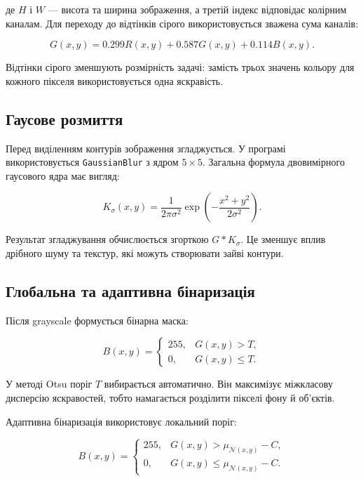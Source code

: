 \documentclass[12pt,a4paper]{article}
\begin{document}
де \(H\) і \(W\) --- висота та ширина зображення, а третій індекс відповідає колірним каналам. Для переходу до відтінків сірого використовується зважена сума каналів:

\begin{equation}
  G(x,y)=0.299R(x,y)+0.587G(x,y)+0.114B(x,y).
\end{equation}

Відтінки сірого зменшують розмірність задачі: замість трьох значень кольору для кожного пікселя використовується одна яскравість.

\subsection{Гаусове розмиття}

Перед виділенням контурів зображення згладжується. У програмі використовується \texttt{GaussianBlur} з ядром \(5\times5\). Загальна формула двовимірного гаусового ядра має вигляд:

\begin{equation}
  K_\sigma(x,y)=\frac{1}{2\pi\sigma^2}
  \exp\left(-\frac{x^2+y^2}{2\sigma^2}\right).
\end{equation}

Результат згладжування обчислюється згорткою \(G*K_\sigma\). Це зменшує вплив дрібного шуму та текстур, які можуть створювати зайві контури.

\subsection{Глобальна та адаптивна бінаризація}

Після grayscale формується бінарна маска:

\begin{equation}
  B(x,y)=
  \begin{cases}
    255, & G(x,y)>T,\\
    0, & G(x,y)\leq T.
  \end{cases}
\end{equation}

У методі Otsu поріг \(T\) вибирається автоматично. Він максимізує міжкласову дисперсію яскравостей, тобто намагається розділити пікселі фону й об'єктів.

Адаптивна бінаризація використовує локальний поріг:

\begin{equation}
  B(x,y)=
  \begin{cases}
    255, & G(x,y)>\mu_{\mathcal{N}(x,y)}-C,\\
    0, & G(x,y)\leq\mu_{\mathcal{N}(x,y)}-C.
  \end{cases}
\end{equation}
\end{document}
